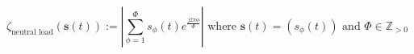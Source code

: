 \begin{equation}
	\zeta_\text{neutral load}(\textbf{s}(t)) := \left|\sum_{\phi=1}^{\Phi} s_\phi(t)e^{\frac{j2\pi\phi}{\Phi}}\right| \text{ where } \textbf{s}(t) = (s_\phi(t)) \text{ and } \Phi \in \mathbb{Z}_{>0}
\label{ch1:equ:neutral-load}
\end{equation}